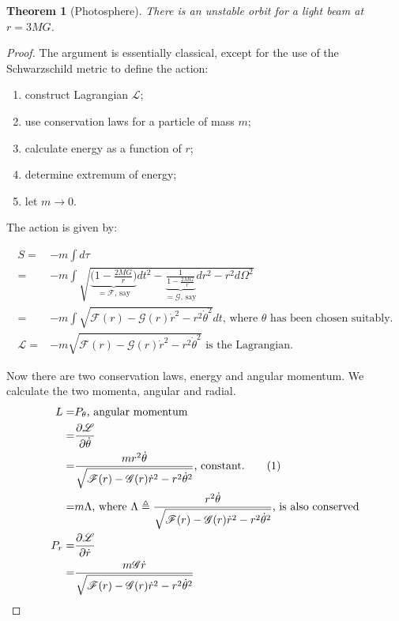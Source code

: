 \documentclass[]{article}
\newcommand\numberthis{\addtocounter{equation}{1}\tag{\theequation}}
\newcommand{\Lagr}{\mathscr{L}}
\newtheorem{thm}{Theorem}
\begin{document}
{\begin{thm}[Photosphere]
	There is an unstable orbit for a light beam at $r=3MG$.
\end{thm}

\begin{proof}
	The argument is essentially classical, except for the use of the Schwarzschild metric to define the action:
	\begin{enumerate}
		\item construct Lagrangian $\Lagr$;
		\item use conservation laws for a particle of mass $m$;
		\item calculate energy as a function of $r$;
		\item determine extremum of energy;
		\item let $m\rightarrow0$.
	\end{enumerate}
	
	The action is given by:
	
	\begin{align*}
		S =&-m \int d\tau\\
		=& -m \int \sqrt{\underbrace{\bigg(1-\frac{2MG}{r}\bigg)}_\text{$=\mathscr{F}$, say}dt^2-\underbrace{\frac{1}{1-\frac{2MG}{r}}}_\text{$=\mathscr{G}$, say}dr^2 - r^2 d\Omega^2} \\
		=& -m \int \sqrt{\mathscr{F}(r)-\mathscr{G}(r)\dot{r}^2 - r^2 \dot{\theta}^2} dt \text{, where $\theta$ has been chosen suitably.}\\
		\Lagr =& -m \sqrt{\mathscr{F}(r)-\mathscr{G}(r)\dot{r}^2 - r^2 \dot{\theta}^2} \text{ is the Lagrangian.}
	\end{align*}
	
	Now there are two conservation laws, energy and angular momentum. We calculate the two momenta, angular and radial.
	\begin{align*}
		L =& P_{\theta} \text{, angular momentum}\\
		=& \frac{\partial \Lagr}{\partial \dot{\theta}}\\
		=& \frac{m r^2 \dot{\theta}}{\sqrt{\mathscr{F}(r)-\mathscr{G}(r)\dot{r}^2 - r^2 \dot{\theta}^2}} \text{, constant.} \numberthis \label{eq:L:light:orbit}\\
		=& m \Lambda \text{, where $\Lambda\triangleq\frac{r^2 \dot{\theta}}{\sqrt{\mathscr{F}(r)-\mathscr{G}(r)\dot{r}^2 - r^2 \dot{\theta}^2}}$, is also conserved}\\
		P_r =& \frac{\partial \Lagr}{\partial \dot{r}}\\
		=& \frac{m \mathscr{G} \dot{r}}{\sqrt{\mathscr{F}(r)-\mathscr{G}(r)\dot{r}^2 - r^2 \dot{\theta}^2}}
	\end{align*}
	

\end{proof}}
\end{document}
